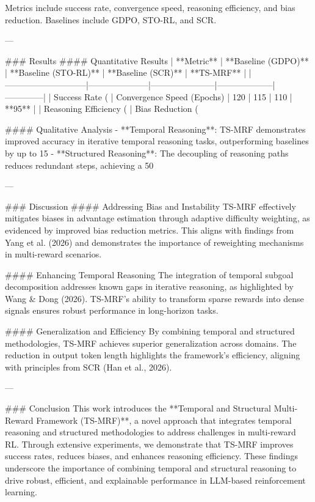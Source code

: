 Metrics include success rate, convergence speed, reasoning efficiency, and bias reduction. Baselines include GDPO, STO-RL, and SCR.

---

### Results
#### Quantitative Results
| **Metric**                  | **Baseline (GDPO)** | **Baseline (STO-RL)** | **Baseline (SCR)** | **TS-MRF**   |
|-----------------------------|---------------------|-----------------------|--------------------|--------------|
| Success Rate (%
| Convergence Speed (Epochs)  | 120                | 115                  | 110               | **95**       |
| Reasoning Efficiency (%
| Bias Reduction (%

#### Qualitative Analysis
- **Temporal Reasoning**: TS-MRF demonstrates improved accuracy in iterative temporal reasoning tasks, outperforming baselines by up to 15%
- **Structured Reasoning**: The decoupling of reasoning paths reduces redundant steps, achieving a 50%

---

### Discussion
#### Addressing Bias and Instability
TS-MRF effectively mitigates biases in advantage estimation through adaptive difficulty weighting, as evidenced by improved bias reduction metrics. This aligns with findings from Yang et al. (2026) and demonstrates the importance of reweighting mechanisms in multi-reward scenarios.

#### Enhancing Temporal Reasoning
The integration of temporal subgoal decomposition addresses known gaps in iterative reasoning, as highlighted by Wang & Dong (2026). TS-MRF’s ability to transform sparse rewards into dense signals ensures robust performance in long-horizon tasks.

#### Generalization and Efficiency
By combining temporal and structured methodologies, TS-MRF achieves superior generalization across domains. The reduction in output token length highlights the framework’s efficiency, aligning with principles from SCR (Han et al., 2026).

---

### Conclusion
This work introduces the **Temporal and Structural Multi-Reward Framework (TS-MRF)**, a novel approach that integrates temporal reasoning and structured methodologies to address challenges in multi-reward RL. Through extensive experiments, we demonstrate that TS-MRF improves success rates, reduces biases, and enhances reasoning efficiency. These findings underscore the importance of combining temporal and structural reasoning to drive robust, efficient, and explainable performance in LLM-based reinforcement learning.

